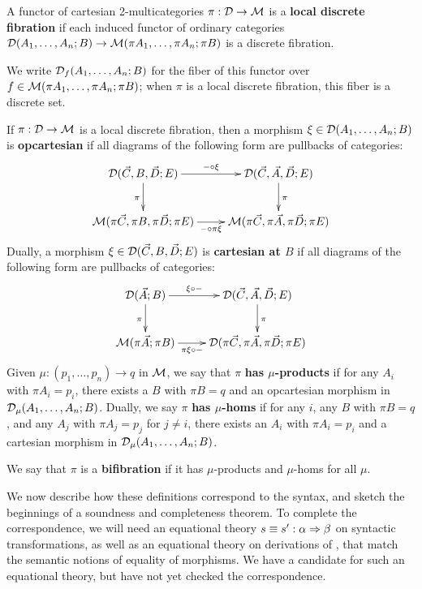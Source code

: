 \begin{definition}
  A functor of cartesian 2-multicategories $\pi:\mathcal{D}\to\mathcal{M}$ is a \textbf{local discrete fibration} if each induced functor of ordinary categories
  $\mathcal{D}(A_1,\dots,A_n;B)\to\mathcal{M}(\pi A_1,\dots,\pi A_n;\pi B)$
  is a discrete fibration.
\end{definition}

We write $\mathcal{D}_f(A_1,\dots,A_n;B)$ for the fiber of this functor over
$f\in \mathcal{M}(\pi A_1,\dots,\pi A_n;\pi B)$; when $\pi$ is a local discrete
fibration, this fiber is a discrete set.

\begin{definition}
  If $\pi:\mathcal{D}\to\mathcal{M}$ is a local discrete fibration, then a morphism $\xi\in\mathcal{D}(A_1,\dots,A_n;B)$ is \textbf{opcartesian} if all diagrams of the following form are pullbacks of categories:
  \[ \xymatrix{
    \cD(\vec C,B,\vec D;E) \ar[r]^-{-\circ \xi} \ar[d]_\pi &
    \cD(\vec C,\vec A,\vec D;E) \ar[d]^\pi \\
    \M(\pi\vec C,\pi B, \pi\vec D; \pi E) \ar[r]_-{-\circ \pi\xi} &
    \M(\pi\vec C,\pi\vec A,\pi\vec D;\pi E)
  }\]
  Dually, a morphism $\xi\in\mathcal{D}(\vec C,B,\vec D;E)$ is \textbf{cartesian at $B$} if all diagrams of the following form are pullbacks of categories:
  \[ \xymatrix{
    \cD(\vec A;B) \ar[r]^-{\xi\circ -} \ar[d]_\pi &
    \cD(\vec C,\vec A,\vec D;E) \ar[d]^\pi \\
    \M(\pi\vec A;\pi B) \ar[r]_-{\pi\xi\circ -} &
    \cD(\pi\vec C,\pi\vec A,\pi\vec D;\pi E)
  }\]
  Given $\mu:(p_1,\dots,p_n) \to q$ in $\mathcal{M}$, we say that $\pi$ \textbf{has $\mu$-products} if for any $A_i$ with $\pi A_i = p_i$, there exists a $B$ with $\pi B = q$ and an opcartesian morphism in $\mathcal{D}_\mu(A_1,\dots,A_n;B)$.
  Dually, we say $\pi$ \textbf{has $\mu$-homs} if for any $i$, any $B$ with $\pi B = q$, and any $A_j$ with $\pi A_j = p_j$ for $j\neq i$, there exists an $A_i$ with $\pi A_i = p_i$ and a cartesian morphism in $\mathcal{D}_\mu(A_1,\dots,A_n;B)$.

  We say that $\pi$ is a \textbf{bifibration} if it has $\mu$-products
  and $\mu$-homs for all $\mu$.
\end{definition}

We now describe how these definitions correspond to the syntax, and
sketch the beginnings of a soundness and completeness theorem.  To complete
the correspondence, we will need an equational theory $s \equiv s' :
\alpha \Rightarrow \beta$ on syntactic transformations, as well as an equational
theory on derivations of , that match the
semantic notions of equality of morphisms.  We have a candidate for such
an equational theory, but have not yet checked the correspondence.  

